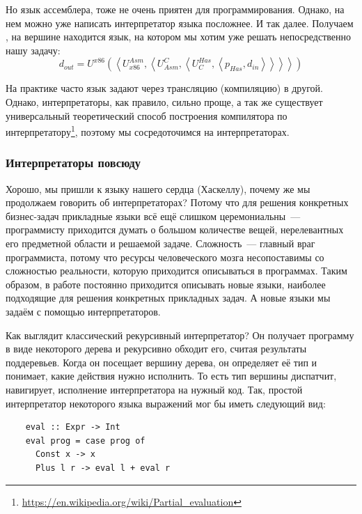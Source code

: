 Но язык ассемблера, тоже не очень приятен для программирования.
Однако, на нем можно уже написать интерпретатор языка посложнее.
И так далее.
Получаем , на вершине находится язык, на котором мы хотим уже решать непосредственно нашу задачу:
\[
    d_{out} =
    U^{x86}\left(\left<
                     U_{x86}^{Asm}, \left<
                                        U^C_{Asm}, \left<
                                                       U^{Has}_C, \left< p_{Has}, d_{in}
                \right>\right>\right>\right>\right)
\]

На практике часто язык задают через трансляцию (компиляцию) в другой.
Однако, интерпретаторы, как правило, сильно проще, а так же существует универсальный теоретический способ построения компилятора по интерпретатору\footnote{\url{https://en.wikipedia.org/wiki/Partial_evaluation}}, поэтому мы сосредоточимся на интерпретаторах.

\subsubsection{Интерпретаторы повсюду} \label{subsec:interpreters-everywhere}

Хорошо, мы пришли к языку нашего сердца (Хаскеллу), почему же мы продолжаем говорить об интерпретаторах?
Потому что для решения конкретных бизнес-задач прикладные языки всё ещё слишком церемониальны~--- программисту приходится думать о большом количестве вещей, нерелевантных его предметной области и решаемой задаче.
Сложность~--- главный враг программиста, потому что ресурсы человеческого мозга несопоставимы со сложностью реальности, которую приходится описываться в программах.
Таким образом, в работе постоянно приходится описывать новые языки, наиболее подходящие для решения конкретных прикладных задач.
А новые языки мы задаём с помощью интерпретаторов.

Как выглядит классический рекурсивный интерпретатор?
Он получает программу в виде некоторого дерева и рекурсивно обходит его, считая результаты поддеревьев.
Когда он посещает вершину дерева, он определяет её тип и понимает, какие действия нужно исполнить.
То есть тип вершины диспатчит, навигирует, исполнение интерпретатора на нужный код.
Так, простой интерпретатор некоторого языка выражений мог бы иметь следующий вид:
\begin{verbatim}
    eval :: Expr -> Int
    eval prog = case prog of
      Const x -> x
      Plus l r -> eval l + eval r
\end{verbatim}

